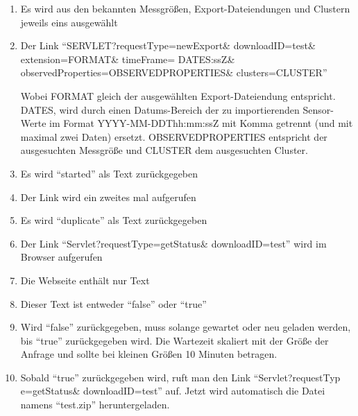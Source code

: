 \begin{enumerate}
\item Es wird aus den bekannten Messgrößen, Export-Dateiendungen und Clustern jeweils eins ausgewählt
\item Der Link ``SERVLET?requestType=newExport\& downloadID=test\& extension=FORMAT\& timeFrame= DATES:ssZ\& observedProperties=\newline OBSERVEDPROPERTIES\& clusters=CLUSTER''
\par
Wobei FORMAT gleich der ausgewählten Export-Dateiendung entspricht. DATES, wird durch einen Datums-Bereich der zu importierenden Sensor-Werte im Format YYYY-MM-DDThh:mm:ssZ mit Komma getrennt (und mit maximal zwei Daten) ersetzt. OBSERVEDPROPERTIES entspricht der ausgesuchten Messgröße und CLUSTER dem ausgesuchten Cluster.
\item Es wird ``started'' als Text zurückgegeben
\item Der Link wird ein zweites mal aufgerufen
\item Es wird ``duplicate'' als Text zurückgegeben
\item Der Link ``Servlet?requestType=getStatus\& downloadID=test'' wird im Browser aufgerufen
\item Die Webseite enthält nur Text
\item Dieser Text ist entweder ``false'' oder ``true''
\item Wird ``false'' zurückgegeben, muss solange gewartet oder neu geladen werden, bis ``true'' zurückgegeben wird. 
\newline
Die Wartezeit skaliert mit der Größe der Anfrage und sollte bei kleinen Größen 10 Minuten betragen.
\item Sobald ``true'' zurückgegeben wird, ruft man den Link ``Servlet?requestTyp e=getStatus\& downloadID=test'' auf. Jetzt wird automatisch die Datei namens ``test.zip'' heruntergeladen.
\end{enumerate}
\szenarioGood